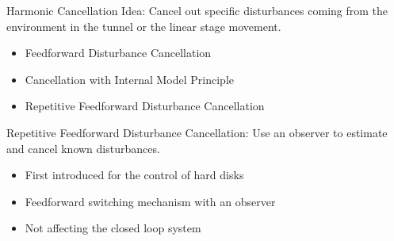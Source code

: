 \documentclass[10pt]{beamer}
\begin{document}
\begin{frame}{Harmonic Cancellation}
  \alert{Idea}: Cancel out specific disturbances coming from the environment in the tunnel or the linear stage movement.
  \begin{itemize}
    \item Feedforward Disturbance Cancellation
    \item Cancellation with Internal Model Principle
    \item Repetitive Feedforward Disturbance Cancellation
  \end{itemize}
  \alert{Repetitive Feedforward Disturbance Cancellation}: Use an observer to estimate and cancel known disturbances.

  \begin{itemize}
    \item First introduced for the control of hard disks
    \item Feedforward switching mechanism with an observer
    \item Not affecting the closed loop system
  \end{itemize}
\end{frame}
\end{document}
